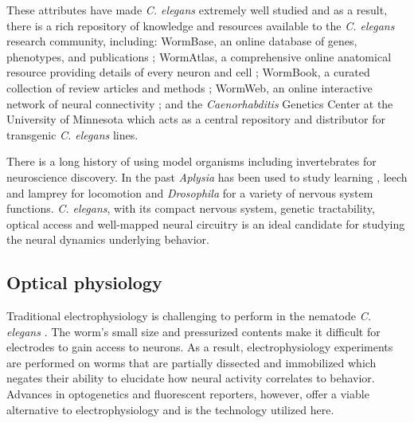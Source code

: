 These attributes have made  \textit{C. elegans}  extremely well studied and as a result, there is a rich repository of knowledge and resources available to the \textit{C. elegans} research community, including:  WormBase, an online database of genes, phenotypes, and publications \citep{harris_wormbase:_2010}; WormAtlas, a comprehensive online anatomical resource providing details of every neuron and cell \citep{altun_wormatlas_2002}; WormBook, a curated collection of review articles and methods \citep{the_c._elegans_research_community_wormbook_2011}; WormWeb, an online interactive network of neural connectivity \citep{bhatla_c._2009};  and the \textit{Caenorhabditis} Genetics Center at the University of Minnesota which acts as a central repository and distributor for transgenic \textit{C. elegans} lines.


There is a long history of using model organisms including invertebrates for neuroscience discovery. In the past \textit{Aplysia} has been used to study learning \citep{castellucci_neuronal_1970}, leech and lamprey for locomotion \citep{briggman_imaging_2006} and \textit{Drosophila} \citep{zhang_drosophila_2010} for a variety of nervous system functions. \textit{C. elegans}, with its compact nervous system, genetic tractability,  optical access and well-mapped neural circuitry is an ideal candidate for studying the neural dynamics underlying behavior.




\subsection{Optical physiology}
Traditional electrophysiology is challenging to perform in the nematode \textit{C. elegans} \citep{goodman_active_1998, schafer_neurophysiological_2006}. The worm's small size and pressurized contents make it difficult for electrodes to gain access to neurons.  As a result, electrophysiology experiments are  performed on worms that are partially dissected and immobilized which negates their ability to elucidate how neural activity correlates to behavior. Advances in optogenetics and fluorescent reporters, however,  offer a viable alternative to electrophysiology and is the technology utilized here.

